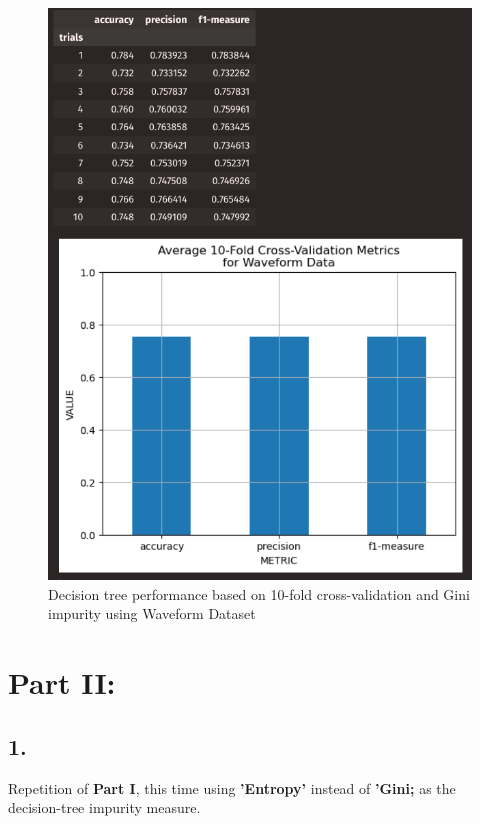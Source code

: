 \documentclass{article}
\begin{document}
\begin{figure}[H]
\begin{minipage}[t]{0.47\textwidth}
            \includegraphics[width=\textwidth, height=0.35\textheight]{1cw.png}
            \caption{Decision tree performance based on 10-fold cross-validation and Gini impurity using Waveform Dataset}
        \end{minipage}
    \end{figure}

    \newpage

    \section*{Part II:}

    \subsection*{1.}

    Repetition of \textbf{Part I}, this time using \textbf{'Entropy'} instead of \textbf{'Gini;} as the decision-tree impurity measure.
\end{document}
